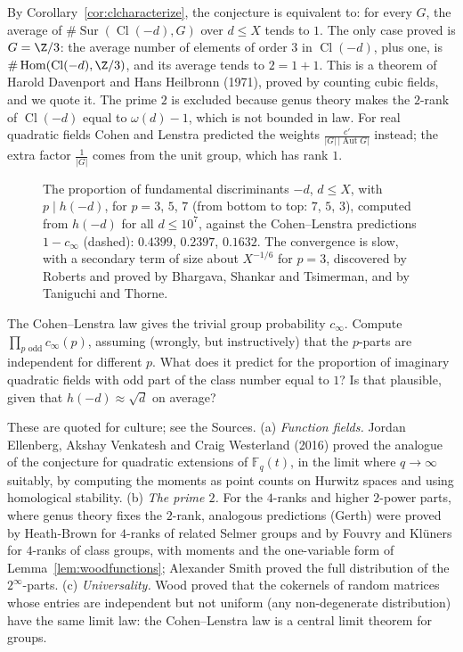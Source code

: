 By Corollary~\ref{cor:clcharacterize}, the conjecture is equivalent to: for every $G$, the average of $\#\operatorname{Sur}(\operatorname{Cl}(-d),G)$ over $d\le X$ tends to $1$. The only case proved is $G=\Z/3$: the average number of elements of order $3$ in $\operatorname{Cl}(-d)$, plus one, is $\#\operatorname{Hom}(\operatorname{Cl}(-d),\Z/3)$, and its average tends to $2=1+1$. This is a theorem of Harold Davenport and Hans Heilbronn (1971), proved by counting cubic fields, and we quote it. The prime $2$ is excluded because genus theory makes the $2$-rank of $\operatorname{Cl}(-d)$ equal to $\omega(d)-1$, which is not bounded in law. For real quadratic fields Cohen and Lenstra predicted the weights $\frac{c'}{|G|\,|\operatorname{Aut}G|}$ instead; the extra factor $\frac1{|G|}$ comes from the unit group, which has rank $1$.

\begin{figure}[ht]
\centering{}
\caption{The proportion of fundamental discriminants $-d$, $d\le X$, with $p\mid h(-d)$, for $p=3$, $5$, $7$ (from bottom to top: $7$, $5$, $3$), computed from $h(-d)$ for all $d\le10^7$, against the Cohen--Lenstra predictions $1-c_\infty$ (dashed): $0.4399$, $0.2397$, $0.1632$. The convergence is slow, with a secondary term of size about $X^{-1/6}$ for $p=3$, discovered by Roberts and proved by Bhargava, Shankar and Tsimerman, and by Taniguchi and Thorne.}
\label{fig:classnumbers}
\end{figure}

\begin{think}
The Cohen--Lenstra law gives the trivial group probability $c_\infty$. Compute $\prod_{p\text{ odd}}c_\infty(p)$, assuming (wrongly, but instructively) that the $p$-parts are independent for different $p$. What does it predict for the proportion of imaginary quadratic fields with odd part of the class number equal to $1$? Is that plausible, given that $h(-d)\approx\sqrt d$ on average?
\end{think}

\begin{remark}
These are quoted for culture; see the Sources. (a) \emph{Function fields.} Jordan Ellenberg, Akshay Venkatesh and Craig Westerland (2016) proved the analogue of the conjecture for quadratic extensions of $\mathbb F_q(t)$, in the limit where $q\to\infty$ suitably, by computing the moments as point counts on Hurwitz spaces and using homological stability. (b) \emph{The prime $2$.} For the $4$-ranks and higher $2$-power parts, where genus theory fixes the $2$-rank, analogous predictions (Gerth) were proved by Heath-Brown for $4$-ranks of related Selmer groups and by Fouvry and Klüners for $4$-ranks of class groups, with moments and the one-variable form of Lemma~\ref{lem:woodfunctions}; Alexander Smith proved the full distribution of the $2^\infty$-parts. (c) \emph{Universality.} Wood proved that the cokernels of random matrices whose entries are independent but not uniform (any non-degenerate distribution) have the same limit law: the Cohen--Lenstra law is a central limit theorem for groups.
\end{remark}


